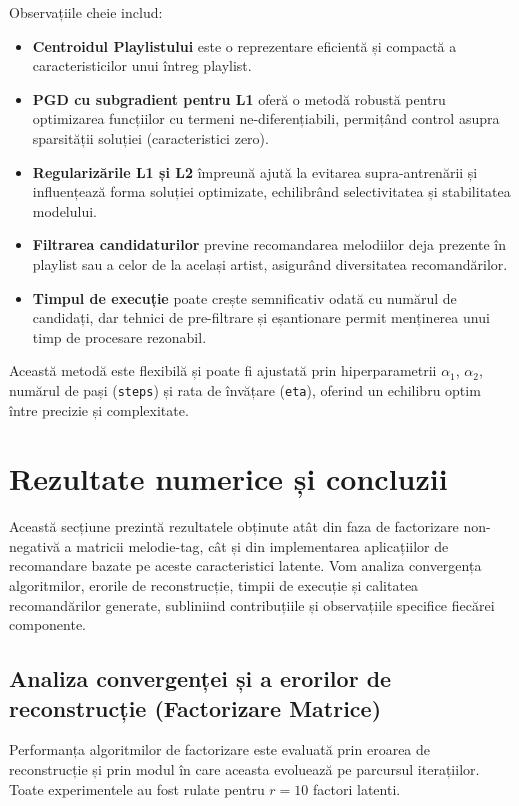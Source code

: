 \documentclass[12pt,a4paper]{article}
\begin{document}
Observațiile cheie includ:  
\begin{itemize}
	\item \textbf{Centroidul Playlistului} este o reprezentare eficientă și compactă a caracteristicilor unui întreg playlist.  
	\item \textbf{PGD cu subgradient pentru L1} oferă o metodă robustă pentru optimizarea funcțiilor cu termeni ne-diferențiabili, permițând control asupra sparsității soluției (caracteristici zero).  
	\item \textbf{Regularizările L1 și L2} împreună ajută la evitarea supra-antrenării și influențează forma soluției optimizate, echilibrând selectivitatea și stabilitatea modelului.  
	\item \textbf{Filtrarea candidaturilor} previne recomandarea melodiilor deja prezente în playlist sau a celor de la același artist, asigurând diversitatea recomandărilor.  
	\item \textbf{Timpul de execuție} poate crește semnificativ odată cu numărul de candidați, dar tehnici de pre-filtrare și eșantionare permit menținerea unui timp de procesare rezonabil.  
\end{itemize}

Această metodă este flexibilă și poate fi ajustată prin hiperparametrii \(\alpha_1\), \(\alpha_2\), numărul de pași (\texttt{steps}) și rata de învățare (\texttt{eta}), oferind un echilibru optim între precizie și complexitate.

	\section{Rezultate numerice și concluzii}

	Această secțiune prezintă rezultatele obținute atât din faza de factorizare non-negativă a matricii melodie-tag, cât și din implementarea aplicațiilor de recomandare bazate pe aceste caracteristici latente. Vom analiza convergența algoritmilor, erorile de reconstrucție, timpii de execuție și calitatea recomandărilor generate, subliniind contribuțiile și observațiile specifice fiecărei componente.

	\subsection{Analiza convergenței și a erorilor de reconstrucție (Factorizare Matrice)}
	\label{subsec:convergenta-erori}

	Performanța algoritmilor de factorizare este evaluată prin eroarea de reconstrucție și prin modul în care aceasta evoluează pe parcursul iterațiilor. Toate experimentele au fost rulate pentru $r=10$ factori latenti.
\end{document}
